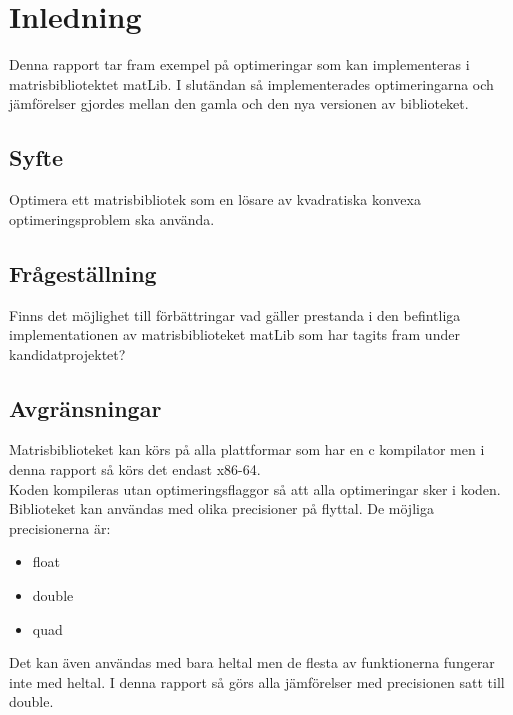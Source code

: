 \section{Inledning}
	Denna rapport tar fram exempel på optimeringar som kan implementeras i matrisbibliotektet matLib. I slutändan så implementerades optimeringarna och jämförelser gjordes mellan den gamla och den nya versionen av biblioteket. 
	\subsection{Syfte}
	Optimera ett matrisbibliotek som en lösare av kvadratiska konvexa optimeringsproblem ska använda. 
	\subsection{Frågeställning}
	Finns det möjlighet till förbättringar vad gäller prestanda i den befintliga implementationen av matrisbiblioteket matLib som har tagits fram under kandidatprojektet?
	\subsection{Avgränsningar}
	Matrisbiblioteket kan körs på alla plattformar som har en c kompilator men i denna rapport så körs det endast x86-64. 
	\\
	Koden kompileras utan optimeringsflaggor så att alla optimeringar sker i koden. 
	\\
	Biblioteket kan användas med olika precisioner på flyttal. De möjliga precisionerna är:
	\begin{itemize}
	\item float
	\item double
	\item quad
	\end{itemize}
	Det kan även användas med bara heltal men de flesta av funktionerna fungerar inte med heltal. I denna rapport så görs alla jämförelser med precisionen satt till double. 